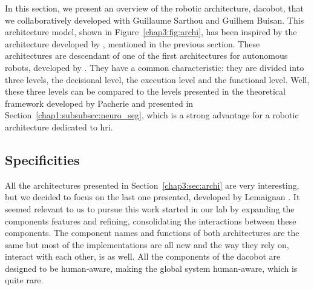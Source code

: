 \documentclass[a4paper,11pt,twoside]{StyleThese}
\begin{document}
In this section, we present an overview of the robotic architecture, \acrfull{dacobot}, that we collaboratively developed with Guillaume Sarthou and Guilhem Buisan. This architecture model, shown in Figure~\ref{chap3:fig:archi}, has been inspired by the architecture developed by \cite{lemaignan_2017_artificial}, mentioned in the previous section. These architectures are descendant of one of the first architectures for autonomous robots, developed by \cite{alami_1998_architecture}. They have a common characteristic: they are divided into three levels, the decisional level, the execution level and the functional level. Well, these three levels can be compared to the levels presented in the theoretical framework developed by Pacherie and presented in Section~\ref{chap1:subsubsec:neuro_seg}, which is a strong advantage for a robotic architecture dedicated to \acrshort{hri}.

\subsection{Specificities}

All the architectures presented in Section~\ref{chap3:sec:archi} are very interesting, but we decided to focus on the last one presented, developed by Lemaignan \etal{}. It seemed relevant to us to pursue this work started in our lab by expanding the components features and refining, consolidating the interactions between these components. The component names and functions of both architectures are the same but most of the implementations are all new and the way they rely on, interact with each other, is as well. All the components of the \acrshort{dacobot} are designed to be human-aware, making the global system human-aware, which is quite rare.
\end{document}
